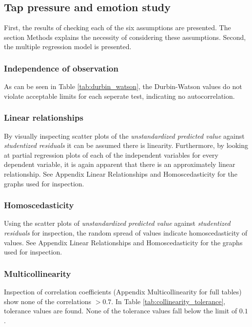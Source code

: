 \documentclass{sigchi}
\begin{document}
\subsection{Tap pressure and emotion study}
First, the results of checking each of the six assumptions are presented. The section Methods explains the necessity of considering these assumptions. Second, the multiple regression model is presented.
\label{sub:assumptions}

\subsubsection{Independence of observation}

As can be seen in Table \ref{tab:durbin_watson}, the Durbin-Watson values do not violate acceptable limits for each seperate test, indicating no autocorrelation.



\subsubsection{Linear relationships}
By visually inspecting scatter plots of the \textit{unstandardized predicted value} against \textit{studentized residuals} it can be assumed there is linearity. Furthermore, by looking at partial regression plots of each of the independent variables for every dependent variable, it is again apparent that there is an approximately linear relationship. See Appendix Linear Relationships and Homoscedasticity for the graphs used for inspection.

\subsubsection{Homoscedasticity}
Using the scatter plots of \textit{unstandardized predicted value} against \textit{studentized residuals} for inspection, the random spread of values indicate homoscedasticity of values. See Appendix Linear Relationships and Homoscedasticity for the graphs used for inspection.

\subsubsection{Multicollinearity}
Inspection of correlation coefficients (Appendix Multicollinearity for full tables) show none of the correlations $> 0.7$. In Table \ref{tab:collinearity_tolerance}, tolerance values are found. None of the tolerance values fall below the limit of $0.1$.

\end{document}
